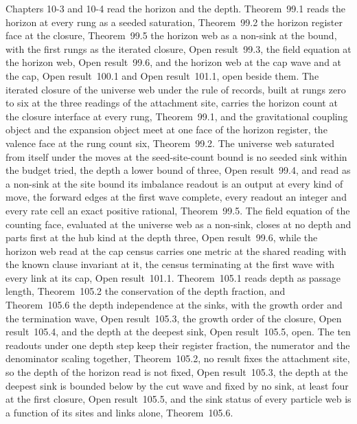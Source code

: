 Chapters 10-3 and 10-4 read the horizon and the depth. Theorem~99.1 reads the horizon at every rung as a seeded saturation, Theorem~99.2 the horizon register face at the closure, Theorem~99.5 the horizon web as a non-sink at the bound, with the first rungs as the iterated closure, Open result~99.3, the field equation at the horizon web, Open result~99.6, and the horizon web at the cap wave and at the cap, Open result~100.1 and Open result~101.1, open beside them. The iterated closure of the universe web under the rule of records, built at rungs zero to six at the three readings of the attachment site, carries the horizon count at the closure interface at every rung, Theorem~99.1, and the gravitational coupling object and the expansion object meet at one face of the horizon register, the valence face at the rung count six, Theorem~99.2. The universe web saturated from itself under the moves at the seed-site-count bound is no seeded sink within the budget tried, the depth a lower bound of three, Open result~99.4, and read as a non-sink at the site bound its imbalance readout is an output at every kind of move, the forward edges at the first wave complete, every readout an integer and every rate cell an exact positive rational, Theorem~99.5. The field equation of the counting face, evaluated at the universe web as a non-sink, closes at no depth and parts first at the hub kind at the depth three, Open result~99.6, while the horizon web read at the cap census carries one metric at the shared reading with the known clause invariant at it, the census terminating at the first wave with every link at its cap, Open result~101.1. Theorem~105.1 reads depth as passage length, Theorem~105.2 the conservation of the depth fraction, and Theorem~105.6 the depth independence at the sinks, with the growth order and the termination wave, Open result~105.3, the growth order of the closure, Open result~105.4, and the depth at the deepest sink, Open result~105.5, open. The ten readouts under one depth step keep their register fraction, the numerator and the denominator scaling together, Theorem~105.2, no result fixes the attachment site, so the depth of the horizon read is not fixed, Open result~105.3, the depth at the deepest sink is bounded below by the cut wave and fixed by no sink, at least four at the first closure, Open result~105.5, and the sink status of every particle web is a function of its sites and links alone, Theorem~105.6.

